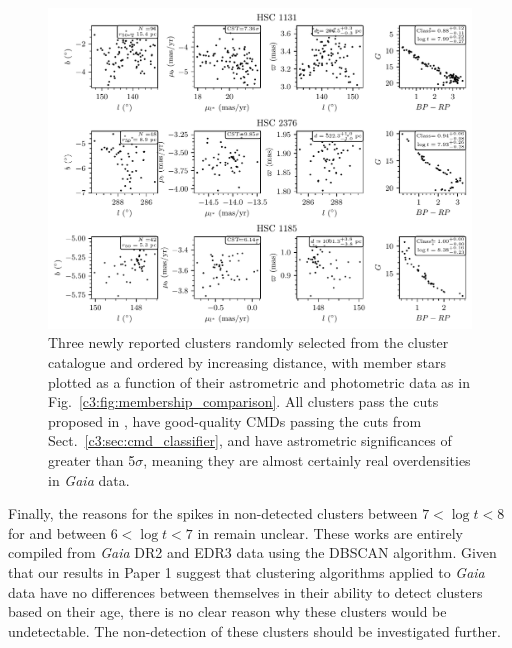 \begin{figure}[t]
   \centering
   \includegraphics[width=\textwidth]{fig/c3/fig_results_suspicious_hsc_clusters.pdf}
   \caption[Three newly reported clusters randomly selected from the cluster catalogue and ordered by increasing distance]{Three newly reported clusters randomly selected from the cluster catalogue and ordered by increasing distance, with member stars plotted as a function of their astrometric and photometric data as in Fig.~\ref{c3:fig:membership_comparison}. All clusters pass the cuts proposed in \cite{cantat-gaudin_clusters_2020}, have good-quality CMDs passing the cuts from Sect.~\ref{c3:sec:cmd_classifier}, and have astrometric significances of greater than 5$\sigma$, meaning they are almost certainly real overdensities in \emph{Gaia} data.}%
   \label{c3:fig:sus_clusters}
\end{figure}

Finally, the reasons for the spikes in non-detected clusters between $7 < \log t < 8$ for \cite{castro-ginard_hunting_2020, castro-ginard_hunting_2022} and between $6 < \log t < 7$ in \cite{hao_newly_2022} remain unclear. These works are entirely compiled from \emph{Gaia} DR2 and EDR3 data using the DBSCAN algorithm. Given that our results in Paper 1 suggest that clustering algorithms applied to \emph{Gaia} data have no differences between themselves in their ability to detect clusters based on their age, there is no clear reason why these clusters would be undetectable. The non-detection of these clusters should be investigated further.


